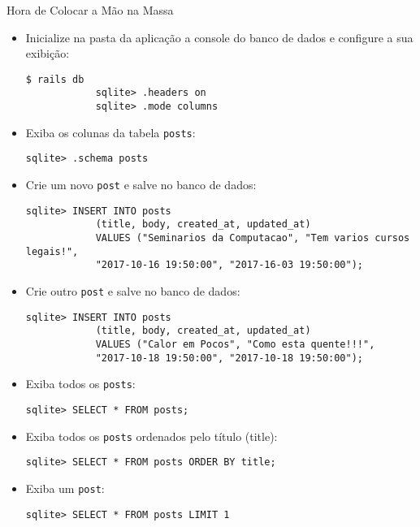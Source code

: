 \begin{frame}{Hora de Colocar a Mão na Massa}
	\begin{itemize}
		\item Inicialize \alert{na pasta da aplicação} a console do banco de dados e
		configure a sua exibição:
		\begin{lstlisting}[style=BashInputBasicStyle]
			$ rails db
			sqlite> .headers on
			sqlite> .mode columns
		\end{lstlisting}
		
		\item Exiba os colunas da tabela \verb|posts|:
		\begin{lstlisting}[style=BashInputBasicStyle]
			sqlite> .schema posts
		\end{lstlisting}
		
		\framebreak
		\item Crie um novo \verb|post| e salve no banco de dados:
		\begin{lstlisting}[style=BashInputBasicStyle]
			sqlite> INSERT INTO posts 
			(title, body, created_at, updated_at) 
			VALUES ("Seminarios da Computacao", "Tem varios cursos legais!", 
			"2017-10-16 19:50:00", "2017-16-03 19:50:00");
		\end{lstlisting}
		
		\item Crie outro \verb|post| e salve no banco de dados:
		\begin{lstlisting}[style=BashInputBasicStyle]
			sqlite> INSERT INTO posts 
			(title, body, created_at, updated_at) 
			VALUES ("Calor em Pocos", "Como esta quente!!!", 
			"2017-10-18 19:50:00", "2017-10-18 19:50:00");
		\end{lstlisting}
		
		\item Exiba todos os \verb|posts|:
		\begin{lstlisting}[style=BashInputBasicStyle]
			sqlite> SELECT * FROM posts;
		\end{lstlisting}
		
		\item Exiba todos os \verb|posts| ordenados pelo título (title):
		\begin{lstlisting}[style=BashInputBasicStyle]
			sqlite> SELECT * FROM posts ORDER BY title;
		\end{lstlisting}
		
		\item Exiba um \verb|post|:
		\begin{lstlisting}[style=BashInputBasicStyle]
			sqlite> SELECT * FROM posts LIMIT 1
		\end{lstlisting}
		

\end{itemize}
\end{frame}
